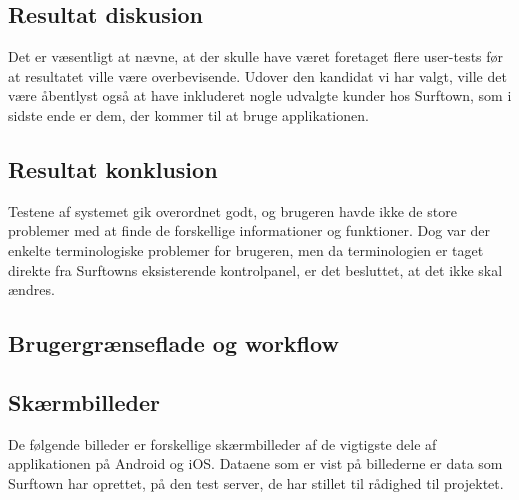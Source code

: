 \documentclass[12pt]{article}
\begin{document}
\subsection*{Resultat diskusion}
Det er væsentligt at nævne, at der skulle have været foretaget flere user-tests før at resultatet ville være overbevisende. Udover den kandidat vi har valgt, ville det være åbentlyst også at have inkluderet nogle udvalgte kunder hos Surftown, som i sidste ende er dem, der kommer til at bruge applikationen. 

\subsection*{Resultat konklusion}
Testene af systemet gik overordnet godt, og brugeren havde ikke de store problemer med at finde de forskellige informationer og funktioner. Dog var der enkelte terminologiske problemer for brugeren, men da terminologien er taget direkte fra Surftowns eksisterende kontrolpanel, er det besluttet, at det ikke  skal ændres. 

\subsection{Brugergrænseflade og workflow}
\subsection*{Skærmbilleder}
De følgende billeder er forskellige skærmbilleder af de vigtigste dele af applikationen på Android og iOS. Dataene som er vist på billederne er data som Surftown har oprettet, på den test server, de har stillet til rådighed til projektet.
\end{document}
